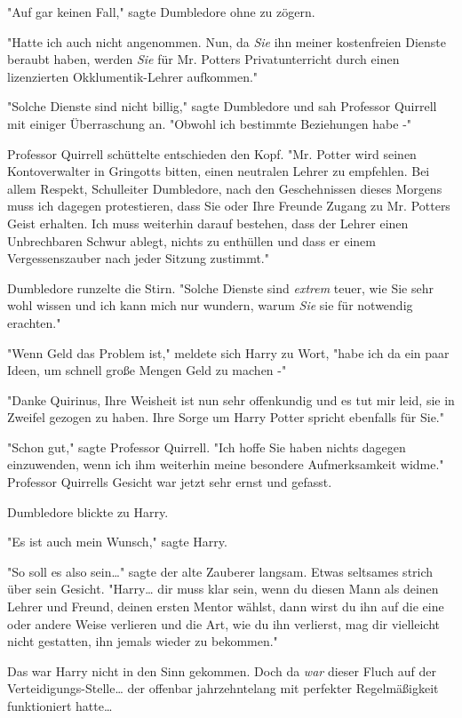 {"Auf gar keinen Fall," sagte Dumbledore ohne zu zögern.

"Hatte ich auch nicht angenommen. Nun, da \emph{Sie} ihn meiner kostenfreien Dienste beraubt haben, werden \emph{Sie} für Mr. Potters Privatunterricht durch einen lizenzierten Okklumentik-Lehrer aufkommen."

"Solche Dienste sind nicht billig," sagte Dumbledore und sah Professor Quirrell mit einiger Überraschung an. "Obwohl ich bestimmte Beziehungen habe -"

Professor Quirrell schüttelte entschieden den Kopf. "Mr. Potter wird seinen Kontoverwalter in Gringotts bitten, einen neutralen Lehrer zu empfehlen. Bei allem Respekt, Schulleiter Dumbledore, nach den Geschehnissen dieses Morgens muss ich dagegen protestieren, dass Sie oder Ihre Freunde Zugang zu Mr. Potters Geist erhalten. Ich muss weiterhin darauf bestehen, dass der Lehrer einen Unbrechbaren Schwur ablegt, nichts zu enthüllen und dass er einem Vergessenszauber nach jeder Sitzung zustimmt."

Dumbledore runzelte die Stirn. "Solche Dienste sind \emph{extrem} teuer, wie Sie sehr wohl wissen und ich kann mich nur wundern, warum \emph{Sie} sie für notwendig erachten."

"Wenn Geld das Problem ist," meldete sich Harry zu Wort, "habe ich da ein paar Ideen, um schnell große Mengen Geld zu machen -"

"Danke Quirinus, Ihre Weisheit ist nun sehr offenkundig und es tut mir leid, sie in Zweifel gezogen zu haben. Ihre Sorge um Harry Potter spricht ebenfalls für Sie."

"Schon gut," sagte Professor Quirrell. "Ich hoffe Sie haben nichts dagegen einzuwenden, wenn ich ihm weiterhin meine besondere Aufmerksamkeit widme." Professor Quirrells Gesicht war jetzt sehr ernst und gefasst.

Dumbledore blickte zu Harry.

"Es ist auch mein Wunsch," sagte Harry.

"So soll es also sein…" sagte der alte Zauberer langsam. Etwas seltsames strich über sein Gesicht. "Harry… dir muss klar sein, wenn du diesen Mann als deinen Lehrer und Freund, deinen ersten Mentor wählst, dann wirst du ihn auf die eine oder andere Weise verlieren und die Art, wie du ihn verlierst, mag dir vielleicht nicht gestatten, ihn jemals wieder zu bekommen."

Das war Harry nicht in den Sinn gekommen. Doch da \emph{war} dieser Fluch auf der Verteidigungs-Stelle… der offenbar jahrzehntelang mit perfekter Regelmäßigkeit funktioniert hatte…

}
